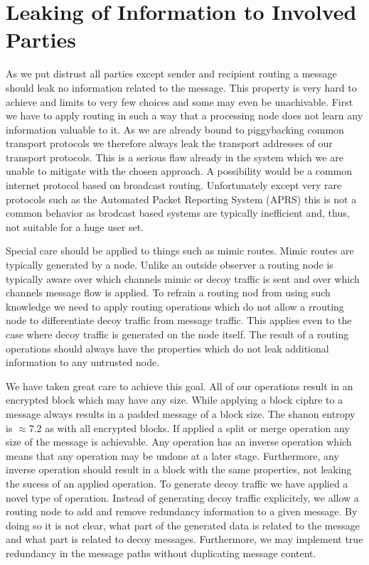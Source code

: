 \section{Leaking of Information to Involved Parties}
As we put distrust all parties except sender and recipient routing a message should leak no information related to the message. This property is very hard to achieve and limits to very few choices and some may even be unachivable. First we have to apply routing in such a way that a processing node does not learn any information valuable to it. As we are already bound to piggybacking common transport protocols we therefore always leak the transport addresses of our transport protocols. This is a serious flaw already in the system which we are unable to mitigate with the chosen approach. A possibility would be a common internet protocol based on broadcast routing. Unfortunately except very rare protocols such as the Automated Packet Reporting System (APRS) this is not a common behavior as brodcast based systems are typically inefficient and, thus, not suitable for a huge user set.

Special care should be applied to things such as mimic routes. Mimic routes are typically generated by a node. Unlike an outside observer a routing node is typically aware over which channels mimic or decoy traffic is sent and over which channels message flow is applied. To refrain a routing nod from using such knowledge we need to apply routing operations which do not allow a rrouting node to differentiate decoy traffic from message traffic. This applies even to the case where decoy traffic is generated on the node itself. The result of a routing operations should always have the properties which do not leak additional information to any untrusted node. 

We have taken great care to achieve this goal. All of our operations result in an encrypted block which may have any size. While applying a block ciphre to a message always results in a padded message of a block size. The shanon entropy is $\approx 7.2$ as with all encrypted blocks. If applied a split or merge operation any size of the message is achievable. Any operation has an inverse operation which means that any operation may be undone at a later stage. Furthermore, any inverse operation should result in a block with the same properties, not leaking the sucess of an applied operation. To generate decoy traffic we have applied a novel type of operation. Instead of generating decoy traffic explicitely, we allow a routing node to add and remove redundancy information to a given message. By doing so it is not clear, what part of the generated data is related to the message and what part is related to decoy messages. Furthermore, we may implement true redundancy in the message paths without duplicating message content.

